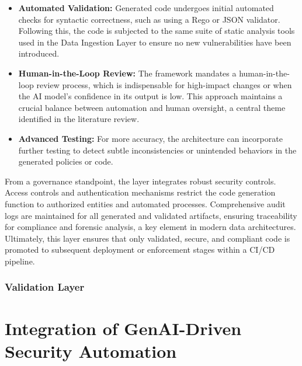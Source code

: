 \begin{itemize}
    \item \textbf{Automated Validation:} Generated code undergoes initial automated checks for syntactic correctness, such as using a Rego or JSON validator. Following this, the code is subjected to the same suite of static analysis tools used in the Data Ingestion Layer to ensure no new vulnerabilities have been introduced.
    \item \textbf{Human-in-the-Loop Review:} The framework mandates a human-in-the-loop review process, which is indispensable for high-impact changes or when the AI model's confidence in its output is low. This approach maintains a crucial balance between automation and human oversight, a central theme identified in the literature review.
    \item \textbf{Advanced Testing:} For more accuracy, the architecture can incorporate further testing to detect subtle inconsistencies or unintended behaviors in the generated policies or code.
\end{itemize}

From a governance standpoint, the layer integrates robust security controls. Access controls and authentication mechanisms restrict the code generation function to authorized entities and automated processes. Comprehensive audit logs are maintained for all generated and validated artifacts, ensuring traceability for compliance and forensic analysis, a key element in modern data architectures\cite{ismail_big_2025-1}. Ultimately, this layer ensures that only validated, secure, and compliant code is promoted to subsequent deployment or enforcement stages within a CI/CD pipeline.


\subsubsection{Validation Layer} %






\section{Integration of GenAI-Driven Security Automation} %
\label{sub:Integration of GenAI-Driven Security Automation}


